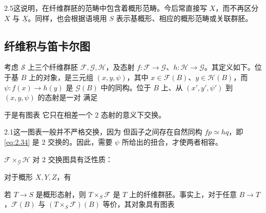 \begin{Note}{2.5}这说明，在纤维群胚的范畴中包含着概形范畴。今后常直接写 $X$，而不再区分 $X$ 与 $\underline X$。同样，也会根据语境用 $S$ 表示基概形、相应的概形范畴或关联群胚。\end{Note}
\subsection{纤维积与笛卡尔图}
\begin{definition}\label{def:2.3}
考虑 $\mathcal S$ 上三个纤维群胚 $\mathcal F,\mathcal G,\mathcal H$，及态射 $f:\mathcal F\to\mathcal G$、$h:\mathcal H\to\mathcal G$。其定义如下。位于基 $B$ 上的对象，是三元组 $(x,y,\psi)$，其中 $x\in\mathcal F(B)$、$y\in\mathcal H(B)$，而 $\psi:f(x)\to h(y)$ 是 $\mathcal G(B)$ 中的同构。位于 $B$ 上、从 $(x',y',\psi')$ 到 $(x,y,\psi)$ 的态射是一对
满足
\end{definition}
于是有图表
它只在相差一个 $2$ 态射的意义下交换。
\begin{Warning}{2.1}这一图表一般并不严格交换，因为
但函子之间存在自然同构 $fp\simeq hq$，即 \eqref{eq:2.34} 是 $2$ 交换的。因此，需要 $\psi$ 所给出的扭合，才使两者相容。
\end{Warning}
$\mathcal F\times_{\mathcal G}\mathcal H$ 对 $2$ 交换图具有泛性质：
\begin{example}\label{ex:2.12}对于概形 $X,Y,Z$，有
\end{example}
\begin{example}[（基变换）]\label{ex:2.13}
若 $T\to S$ 是概形态射，则 $T\times_S\mathcal F$ 是 $T$ 上的纤维群胚。事实上，对于任意 $B\to T$，$\mathcal F(B)$ 与 $(T\times_S\mathcal F)(B)$ 等价，其对象具有图表
\end{example}
